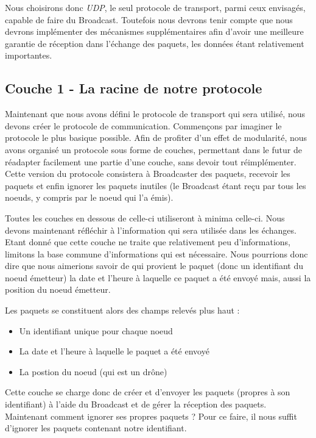 \documentclass[journal, a4paper]{IEEEtran}
\begin{document}
        Nous choisirons donc \textit{UDP}, le seul protocole de transport, parmi ceux envisagés, capable de faire du Broadcast. Toutefois nous devrons tenir compte que nous 
        devrons implémenter des mécanismes supplémentaires afin d'avoir une meilleure garantie de réception dans l'échange des paquets, les données étant relativement importantes.


\subsection{Couche 1 - La racine de notre protocole}
        Maintenant que nous avons défini le protocole de transport qui sera utilisé, nous devons créer le protocole de communication. Commençons par imaginer le protocole le plus basique possible.
        Afin de profiter d'un effet de modularité, nous avons organisé un protocole sous forme de couches, permettant dans le futur de réadapter facilement une partie d'une 
        couche, sans devoir tout réimplémenter.
        Cette version du protocole consistera à Broadcaster des paquets, recevoir les paquets et enfin ignorer les paquets inutiles (le Broadcast étant reçu par tous les noeuds, y compris par le noeud qui l'a émis).

        Toutes les couches en dessous de celle-ci utiliseront à minima celle-ci.
        Nous devons maintenant réfléchir à l'information qui sera utilisée dans les échanges. Etant donné que cette couche ne traite que relativement peu d'informations, limitons la base 
        commune d'informations qui est nécessaire. Nous pourrions donc dire que nous aimerions savoir de qui provient le paquet (donc un identifiant du noeud émetteur) la date et l'heure à 
        laquelle ce paquet a été envoyé mais, aussi la position du noeud émetteur.

        Les paquets se constituent alors des champs relevés plus haut :
        \begin{itemize}
                \item Un identifiant unique pour chaque noeud
                \item La date et l'heure à laquelle le paquet a été envoyé 
                \item La postion du noeud (qui est un drône)
        \end{itemize}

        Cette couche se charge donc de créer et d'envoyer les paquets (propres à son identifiant) à l'aide du Broadcast et de gérer la réception des paquets. Maintenant comment ignorer ses propres 
        paquets ? Pour ce faire, il nous suffit d'ignorer les paquets contenant notre identifiant.
\end{document}
